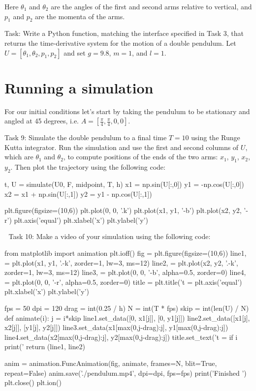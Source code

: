 \documentclass[main.tex]{subfiles}
\begin{document}
Here $\theta_1$ and $\theta_2$ are the angles of the first and second arms relative to vertical, and $p_1$ and $p_2$ are the momenta of the arms.

Task: 
Write a Python function, matching the interface specified in Task 3, that returns the time-derivative system for the motion of a double pendulum.  
Let $U = [\theta_1, \theta_2, p_1, p_2]$ and set $g=9.8$, $m=1$, and $l=1$.

\section{Running a simulation}

For our initial conditions let's start by taking the pendulum to be stationary and angled at 45 degrees, i.e. $A = [\frac{\pi}{4}, \frac{\pi}{4}, 0, 0]$.

Task 9: 
Simulate the double pendulum to a final time $T=10$ using the Runge Kutta integrator.  
Run the simulation and use the first and second columns of $U$, which are $\theta_1$ and $\theta_2$, to compute positions of the ends of the two arms: $x_1$, $y_1$, $x_2$, $y_2$.  
Then plot the trajectory using the following code:

\begin{python}
t, U = simulate(U0, F, midpoint, T, h)
x1 = np.sin(U[:,0])
y1 = -np.cos(U[:,0])
x2 = x1 + np.sin(U[:,1])
y2 = y1 - np.cos(U[:,1])

plt.figure(figsize=(10,6))
plt.plot(0, 0, '.k')
plt.plot(x1, y1, '-b')
plt.plot(x2, y2, '-r')
plt.axis('equal')
plt.xlabel('x')
plt.ylabel('y')
\end{python}
Task 10: Make a video of your simulation using the following code:

\begin{python}
from matplotlib import animation
plt.ioff()
fig = plt.figure(figsize=(10,6))
line1, = plt.plot(x1, y1, '.-k', zorder=1, lw=3, ms=12)
line2, = plt.plot(x2, y2, '.-k', zorder=1, lw=3, ms=12)
line3, = plt.plot(0, 0, '-b', alpha=0.5, zorder=0)
line4, = plt.plot(0, 0, '-r', alpha=0.5, zorder=0)
title = plt.title('t = %
plt.axis('equal')
plt.xlabel('x')
plt.ylabel('y')

fps = 50
dpi = 120
drag = int(0.25 / h)
N = int(T * fps)
skip = int(len(U) / N)
def animate(i):
    j = i*skip
    line1.set_data([0, x1[j]], [0, y1[j]])
    line2.set_data([x1[j], x2[j]], [y1[j], y2[j]])
    line3.set_data(x1[max(0,j-drag):j], y1[max(0,j-drag):j])
    line4.set_data(x2[max(0,j-drag):j], y2[max(0,j-drag):j])
    title.set_text('t = %
    if i %
        print('%
    return (line1, line2)

anim = animation.FuncAnimation(fig, animate, frames=N,
                               blit=True, repeat=False)
anim.save('./pendulum.mp4', dpi=dpi, fps=fps)
print('Finished    ')
plt.close()
plt.ion()
\end{python}
\end{document}
